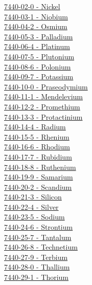 \begin{multicols}{2}
\hyperref[sec:elem-nickel]{7440-02-0 - Nickel}\\
\hyperref[sec:elem-niobium]{7440-03-1 - Niobium}\\
\hyperref[sec:elem-osmium]{7440-04-2 - Osmium}\\
\hyperref[sec:elem-palladium]{7440-05-3 - Palladium}\\
\hyperref[sec:elem-platinum]{7440-06-4 - Platinum}\\
\hyperref[sec:elem-plutonium]{7440-07-5 - Plutonium}\\
\hyperref[sec:elem-polonium]{7440-08-6 - Polonium}\\
\hyperref[sec:elem-potassium]{7440-09-7 - Potassium}\\
\hyperref[sec:elem-praseodymium]{7440-10-0 - Praseodymium}\\
\hyperref[sec:elem-mendelevium]{7440-11-1 - Mendelevium}\\
\hyperref[sec:elem-promethium]{7440-12-2 - Promethium}\\
\hyperref[sec:elem-protactinium]{7440-13-3 - Protactinium}\\
\hyperref[sec:elem-radium]{7440-14-4 - Radium}\\
\hyperref[sec:elem-rhenium]{7440-15-5 - Rhenium}\\
\hyperref[sec:elem-rhodium]{7440-16-6 - Rhodium}\\
\hyperref[sec:elem-rubidium]{7440-17-7 - Rubidium}\\
\hyperref[sec:elem-ruthenium]{7440-18-8 - Ruthenium}\\
\hyperref[sec:elem-samarium]{7440-19-9 - Samarium}\\
\hyperref[sec:elem-scandium]{7440-20-2 - Scandium}\\
\hyperref[sec:elem-silicon]{7440-21-3 - Silicon}\\
\hyperref[sec:elem-silver]{7440-22-4 - Silver}\\
\hyperref[sec:elem-sodium]{7440-23-5 - Sodium}\\
\hyperref[sec:elem-strontium]{7440-24-6 - Strontium}\\
\hyperref[sec:elem-tantalum]{7440-25-7 - Tantalum}\\
\hyperref[sec:elem-technetium]{7440-26-8 - Technetium}\\
\hyperref[sec:elem-terbium]{7440-27-9 - Terbium}\\
\hyperref[sec:elem-thallium]{7440-28-0 - Thallium}\\
\hyperref[sec:elem-thorium]{7440-29-1 - Thorium}\\

\end{multicols}
